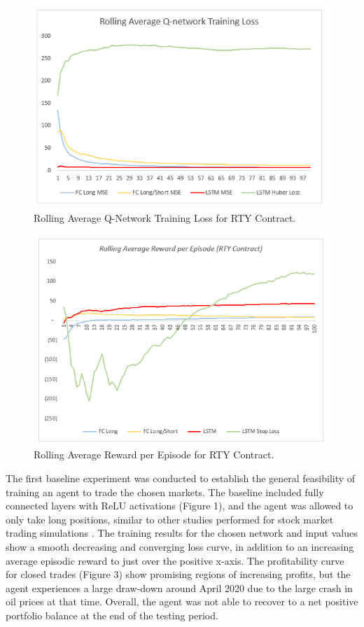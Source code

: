 \documentclass[10pt,twocolumn,letterpaper]{article}
\begin{document}
\begin{figure}[hbt!]
\begin{center}
     \includegraphics[scale=0.54]{average_loss.PNG}
     \caption{Rolling Average Q-Network Training Loss for RTY Contract.}
\end{center}
\end{figure}
\begin{figure}[hbt!]
\begin{center}
     \includegraphics[scale=0.52]{average_reward.PNG}
     \caption{Rolling Average Reward per Episode for RTY Contract.}
\end{center}
\end{figure}

The first baseline experiment was conducted to establish the general feasibility of training an agent to trade the chosen markets. The baseline included fully connected layers with ReLU activations (Figure 1), and the agent was allowed to only take long positions, similar to other studies performed for stock market trading simulations \cite{ensemble}. The training results for the chosen network and input values show a smooth decreasing and converging loss curve, in addition to an increasing average episodic reward to just over the positive x-axis. The profitability curve for closed trades (Figure 3) show promising regions of increasing profits, but the agent experiences a large draw-down around April 2020 due to the large crash in oil prices at that time. Overall, the agent was not able to recover to a net positive portfolio balance at the end of the testing period.
\end{document}
